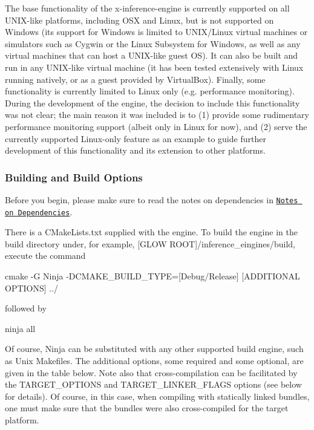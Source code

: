 The base functionality of the {\ttfamily x-\/inference-\/engine} is currently supported on all U\+N\+I\+X-\/like platforms, including O\+SX and Linux, but is not supported on Windows (its support for Windows is limited to U\+N\+I\+X/\+Linux virtual machines or simulators such as Cygwin or the Linux Subsystem for Windows, as well as any virtual machines that can host a U\+N\+I\+X-\/like guest OS). It can also be built and run in any U\+N\+I\+X-\/like virtual machine (it has been tested extensively with Linux running natively, or as a guest provided by Virtual\+Box). Finally, some functionality is currently limited to Linux only (e.\+g. performance monitoring). During the development of the engine, the decision to include this functionality was not clear; the main reason it was included is to (1) provide some rudimentary performance monitoring support (albeit only in Linux for now), and (2) serve the currently supported Linux-\/only feature as an example to guide further development of this functionality and its extension to other platforms.

\subsubsection*{Building and Build Options}

Before you begin, please make sure to read the notes on dependencies in \href{#technical-notes-and-notes-on-dependencies}{\tt Notes on Dependencies}.

There is a {\ttfamily C\+Make\+Lists.\+txt} supplied with the engine. To build the engine in the {\ttfamily build} directory under, for example, {\ttfamily \mbox{[}G\+L\+OW R\+O\+OT\mbox{]}/inference\+\_\+eingines/build}, execute the command 
\begin{DoxyCode}
cmake -G Ninja -DCMAKE\_BUILD\_TYPE=[Debug/Release] [ADDITIONAL OPTIONS] ../
\end{DoxyCode}
 followed by 
\begin{DoxyCode}
ninja all
\end{DoxyCode}


Of course, {\ttfamily Ninja} can be substituted with any other supported build engine, such as {\ttfamily Unix Makefiles}. The additional options, some required and some optional, are given in the table below. Note also that cross-\/compilation can be facilitated by the {\ttfamily T\+A\+R\+G\+E\+T\+\_\+\+O\+P\+T\+I\+O\+NS} and {\ttfamily T\+A\+R\+G\+E\+T\+\_\+\+L\+I\+N\+K\+E\+R\+\_\+\+F\+L\+A\+GS} options (see below for details). Of course, in this case, when compiling with statically linked bundles, one must make sure that the bundles were also cross-\/compiled for the target platform.

